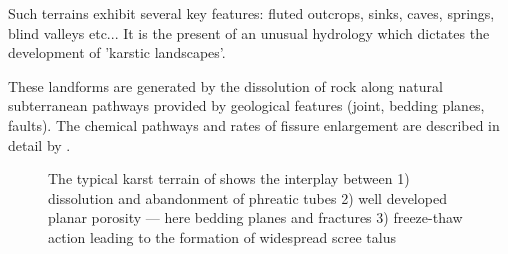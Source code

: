 Such terrains exhibit several key features: fluted outcrops, sinks, caves, springs, blind valleys etc... It is the present of an unusual hydrology which dictates the development of 'karstic landscapes'. 

These landforms are generated by the dissolution of rock along natural subterranean pathways provided by geological features (joint, bedding planes, faults). The chemical pathways and rates of fissure enlargement are described in detail by \citet{dreybrodt1996principles}.

\begin{figure}[t!]
\checkoddpage \ifoddpage \forcerectofloat \else \forceversofloat \fi
{}
\caption{The typical karst terrain of  shows the interplay between 1) dissolution and abandonment of phreatic tubes 2) well developed planar porosity --- here bedding planes and fractures 3) freeze-thaw action leading to the formation of widespread scree talus }
\label{fig:shaft}
\end{figure}

